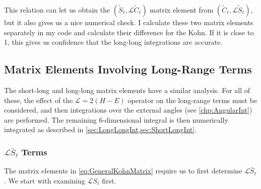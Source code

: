 \documentclass[Dissertation.tex]{subfiles}
\begin{document}
This relation can let us obtain the
$(\widetilde{S}_\ell,\mathcal{L}\widetilde{C}_\ell)$ matrix element from
$(\widetilde{C}_\ell,\mathcal{L}\widetilde{S}_\ell)$, but it also gives us a 
nice numerical check. I calculate these two matrix elements separately in my 
code and calculate their difference for the Kohn. If it is close to 1, this
gives us confidence that the long-long integrations are accurate.


\subsection{Matrix Elements Involving Long-Range Terms}
\label{sec:MatrixLong}
The short-long and long-long matrix elements have a similar analysis. For all 
of these, the effect of the $\mathcal{L} = 2(H-E)$ operator on the long-range 
terms must be considered, and then integrations over the external angles (see 
\cref{chp:AngularInt}) are performed. The remaining 6-dimensional integral is 
then numerically integrated as described in \cref{sec:LongLongInt,sec:ShortLongInt}.

\subsubsection{\texorpdfstring{$\mathcal{L}\bar{S}_\ell$}{LS} Terms}
\label{sec:LSTerms}
The matrix elements in \cref{eq:GeneralKohnMatrix} require us to first determine
$\mathcal{L}\bar{S}_\ell$. We start with examining $\mathcal{L}S_\ell$ first.
\end{document}
